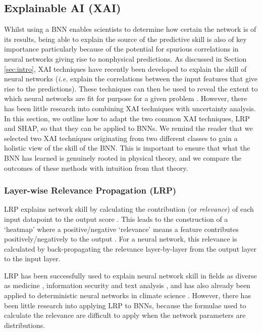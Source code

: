 \documentclass[a4paper]{article}
\begin{document}
\subsection{Explainable AI (XAI)}\label{sec:XAI}
Whilst using a BNN enables scientists to determine how certain the network is of its results, being able to explain the source of the predictive skill is also of key importance particularly because of the potential for spurious correlations in neural networks giving rise to nonphysical predictions. As discussed in Section \ref{sec:intro}, XAI techniques have recently been developed to explain the skill of neural networks (\textit{i.e.} explain the correlations between the input features that give rise to the predictions). These techniques can then be used to reveal the extent to which neural networks are fit for purpose for a given problem \citep{samek2019explainable,arrieta2020explainable}. However, there has been little research into combining XAI techniques with uncertainty analysis. In this section, we outline how to adapt the two common XAI techniques, LRP and SHAP, so that they can be applied to BNNs. We remind the reader that we selected two XAI techniques originating from two different classes to gain a holistic view of the skill of the BNN. This is important to ensure that what the BNN has learned is genuinely rooted in physical theory, and we compare the outcomes of these methods with intuition from that theory.

\subsubsection{Layer-wise Relevance Propagation (LRP)}\label{LRP_method}
LRP explains network skill by calculating the contribution (or \emph{relevance}) of each input datapoint to the output score \citep{binder2016layer}. This leads to the construction of a `heatmap' where a positive/negative `relevance' means a feature contributes positively/negatively to the output \citep{bach2015pixel}. For a neural network, this relevance is calculated by back-propagating the relevance layer-by-layer from the output layer to the input layer. 

LRP has been successfully used to explain neural network skill in fields as diverse as medicine \citep{bohle2019layer}, information security \citep{seibold2020accurate} and text analysis \citep{arras2017relevant}, and has also already been applied to deterministic neural networks in climate science \citep{THOR,toms2020physically,Mamalakis2022}. However, there has been little research into applying LRP to BNNs, because the formulae used to calculate the relevance are difficult to apply when the network parameters are distributions. 
\end{document}
